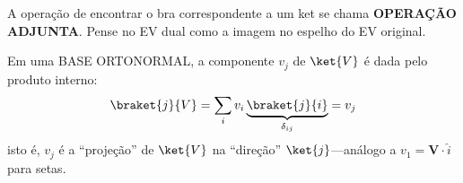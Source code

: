 A operação de encontrar o bra correspondente a um ket se chama \textbf{OPERAÇÃO ADJUNTA}. Pense no EV dual como a imagem no espelho do EV original.


\vspace{4pt}
Em uma BASE ORTONORMAL, a componente $v_j$ de $\ket{V}$ é dada pelo produto interno:
\[
    \braket{j}{V} = \sum_i v_i \underbrace{\braket{j}{i}}_{\delta_{ij}} = v_j
\]
isto é, $v_j$ é a ``projeção'' de $\ket{V}$ na ``direção'' $\ket{j}$---análogo a $v_1 = {\bm V}\cdot\hat{i}$ para setas.
